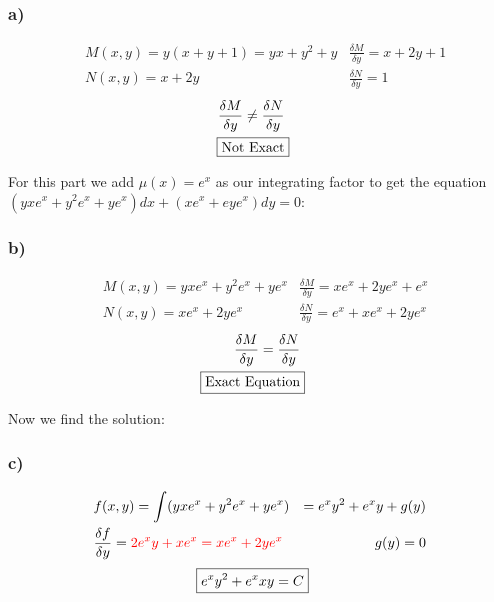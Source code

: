 \documentclass{article}
\begin{document}
\subsubsection{a)}
\begin{align*}
    &M(x,y) = y(x + y + 1) = yx + y^2 + y & \frac{\delta M}{\delta y} = x + 2y + 1\\
    &N(x,y) = x + 2y & \frac{\delta N}{\delta y} = 1 
\end{align*}
\begin{align*}
    \frac{\delta M}{\delta y} \not= \frac{\delta N}{\delta y}\\ \Aboxed{\text{Not Exact}}
\end{align*}


\setcounter{subsubsection}{1}
For this part we add $\mu(x) = e^x$ as our integrating factor to get the equation 
$(yxe^x + y^2e^x + ye^x)dx + (xe^x + eye^x)dy = 0$:
\subsubsection{b)} 
\begin{align*}
    &M(x,y) =  yxe^x + y^2e^x + ye^x & \frac{\delta M}{\delta y} = xe^x + 2ye^x + e^x\\
    &N(x,y) = xe^x + 2ye^x & \frac{\delta N}{\delta y} = e^x + xe^x + 2ye^x
\end{align*}
\begin{align*}
    \frac{\delta M}{\delta y} = \frac{\delta N}{\delta y}\\ \Aboxed{\text{Exact Equation}}
\end{align*}

\setcounter{subsubsection}{1}
Now we find the solution:
\subsubsection{c)} 
\begin{align}
    & f(x,y) = \int(yxe^x + y^2e^x + ye^x) &= e^xy^2 + e^xy + g(y) \\
    & \frac{\delta f}{\delta y} = \textcolor{red}{2e^xy+xe^x = xe^x + 2ye^x} & g(y) = 0
\end{align}
\begin{align}
     \Aboxed{e^xy^2 + e^xxy = C}
\end{align}
\end{document}
